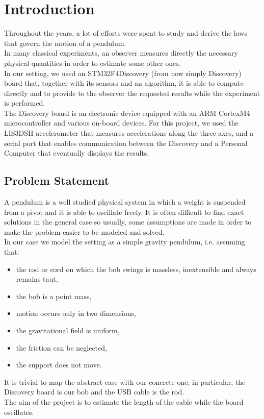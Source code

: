 \section{Introduction}
Throughout the years, a lot of efforts were spent to study and derive the laws that govern the motion of a pendulum. \\
In many classical experiments, an observer measures directly the necessary physical quantities in order to estimate some other ones. \\
In our setting, we used an STM32F4Discovery (from now simply Discovery) board that, together with its sensors and an algorithm, it is able to compute directly and to provide to the observer the requested results while the experiment is performed. \\
The Discovery board is an electronic device equipped with an ARM CortexM4 microcontroller and various on-board devices. For this project, we used the LIS3DSH accelerometer that measures accelerations along the three axes, and a serial port that enables communication between the Discovery and a Personal Computer that eventually displays the results. \\

\subsection{Problem Statement}
A pendulum is a well studied physical system in which a weight is suspended from a pivot and it is able to oscillate freely. It is often difficult to find exact solutions in the general case so usually, some assumptions are made in order to make the problem easier to be modeled and solved. \\
In our case we model the setting as a simple gravity pendulum, i.e. assuming that:
\begin{itemize}
	\item the rod or cord on which the bob swings is massless, inextensible and always remains taut,
	\item the bob is a point mass,
	\item motion occurs only in two dimensions,
	\item the gravitational field is uniform,
	\item the friction can be neglected,
	\item the support does not move.
\end{itemize}
It is trivial to map the abstract case with our concrete one, in particular, the Discovery board is our bob and the USB cable is the rod. \\
The aim of the project is to estimate the length of the cable while the board oscillates.
